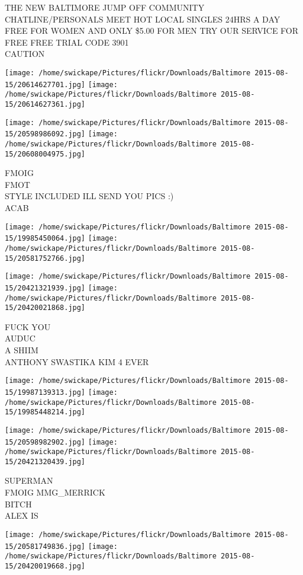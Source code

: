 \documentclass[10pt,letterpaper]{article}
\begin{document}
THE NEW BALTIMORE JUMP OFF COMMUNITY CHATLINE/PERSONALS MEET HOT LOCAL SINGLES 24HRS A DAY FREE FOR WOMEN AND ONLY \$5.00 FOR MEN TRY OUR SERVICE FOR FREE FREE TRIAL CODE 3901\\
CAUTION
\pagebreak

\texttt{[image: /home/swickape/Pictures/flickr/Downloads/Baltimore 2015-08-15/20614627701.jpg]}
\texttt{[image: /home/swickape/Pictures/flickr/Downloads/Baltimore 2015-08-15/20614627361.jpg]}

\texttt{[image: /home/swickape/Pictures/flickr/Downloads/Baltimore 2015-08-15/20598986092.jpg]}
\texttt{[image: /home/swickape/Pictures/flickr/Downloads/Baltimore 2015-08-15/20608004975.jpg]}

FMOIG\\
FMOT\\
STYLE INCLUDED ILL SEND YOU PICS :)\\
ACAB
\pagebreak

\texttt{[image: /home/swickape/Pictures/flickr/Downloads/Baltimore 2015-08-15/19985450064.jpg]}
\texttt{[image: /home/swickape/Pictures/flickr/Downloads/Baltimore 2015-08-15/20581752766.jpg]}

\texttt{[image: /home/swickape/Pictures/flickr/Downloads/Baltimore 2015-08-15/20421321939.jpg]}
\texttt{[image: /home/swickape/Pictures/flickr/Downloads/Baltimore 2015-08-15/20420021868.jpg]}

FUCK YOU\\
AUDUC\\
A SHIIM\\
ANTHONY SWASTIKA KIM 4 EVER
\pagebreak

\texttt{[image: /home/swickape/Pictures/flickr/Downloads/Baltimore 2015-08-15/19987139313.jpg]}
\texttt{[image: /home/swickape/Pictures/flickr/Downloads/Baltimore 2015-08-15/19985448214.jpg]}

\texttt{[image: /home/swickape/Pictures/flickr/Downloads/Baltimore 2015-08-15/20598982902.jpg]}
\texttt{[image: /home/swickape/Pictures/flickr/Downloads/Baltimore 2015-08-15/20421320439.jpg]}

SUPERMAN\\
FMOIG MMG\_MERRICK\\
BITCH\\
ALEX IS
\pagebreak

\texttt{[image: /home/swickape/Pictures/flickr/Downloads/Baltimore 2015-08-15/20581749836.jpg]}
\texttt{[image: /home/swickape/Pictures/flickr/Downloads/Baltimore 2015-08-15/20420019668.jpg]}
\end{document}
